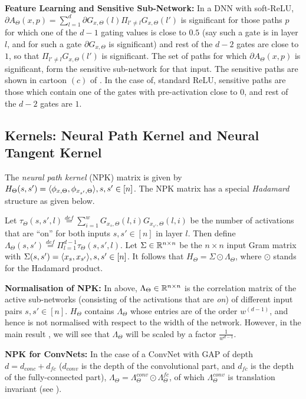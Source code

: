 \textbf{Feature Learning and Sensitive Sub-Network:} In a DNN with soft-ReLU, $\partial A_{\Theta}(x,p)=\sum_{l=1}^d \partial G_{x,\Theta}(l)\Pi_{l'\neq l}G_{x,\Theta}(l')$ is significant for those paths $p$ for which one of the $d-1$ gating values is close to $0.5$ (say such a gate is in layer $l$, and for such a gate $\partial G_{x,\Theta}$ is significant) and rest of the $d-2$ gates are close to $1$, so that $\Pi_{l'\neq l}G_{x,\Theta}(l')$ is significant. The set of paths for which $\partial A_{\Theta}(x,p)$ is significant, form the sensitive sub-network for that input. The sensitive paths are shown in cartoon $(c)$ of . In the case of, standard ReLU, sensitive paths are those which contain one of the gates with pre-activation close to $0$, and rest of the $d-2$ gates are $1$.
\subsection{Kernels: Neural Path Kernel and Neural Tangent Kernel}\label{sec:ker}
The \emph{neural path kernel} (NPK) matrix is given by $H_{\Theta}(s,s')=\langle \phi_{x,\Theta},\phi_{x_{s'},\Theta}\rangle, s, s'\in[n]$. The NPK matrix has a special \emph{Hadamard} structure as given below.
\begin{lemma}\label{lm:npk}
Let $\tau_{\Theta}(s,s',l)\stackrel{def}=\sum_{i=1}^w G_{x_s,\Theta}(l,i)G_{x_{s'},\Theta}(l,i)$ be the number of activations that are ``on'' for both inputs $s,s'\in[n]$ in layer $l$. Then define $\Lambda_{\Theta}(s,s')\stackrel{def}=\Pi_{l=1}^{d-1}\tau_{\Theta}(s,s',l)$.
Let $\Sigma \in \mathbb{R}^{n\times n}$ be the $n\times n $ input Gram matrix with  $\Sigma(s,s')=\langle x_s,x_{s'}\rangle,s,s'\in[n]$. It follows that $H_{\Theta}= \Sigma\odot\Lambda_{\Theta}$, where $\odot$ stands for the Hadamard product. 
\end{lemma}
\textbf{Normalisation of NPK:} In  above, $\Lambda_{\Theta}\in\mathbb{R}^{n\times n}$ is the correlation matrix of the active sub-networks (consisting of the activations that are \emph{on}) of different input pairs $s,s'\in[n]$. $H_{\Theta}$ contains $\Lambda_{\Theta}$ whose entries are of the order $w^{(d-1)}$, and hence is not normalised with respect to the width of the network.  However, in the main result , we will see that $\Lambda_{\Theta}$ will be scaled by a factor $\frac{1}{w^{d-1}}$. 

\textbf{NPK for ConvNets:} In the case of a ConvNet  with GAP of depth $d=d_{conc}+d_{fc}$ ($d_{conv}$ is the depth of the convolutional part, and $d_{fc}$ is the depth of the fully-connected part), $\Lambda_{\Theta}=\Lambda^{conv}_{\Theta}\odot\Lambda^{fc}_{\Theta}$, of which $\Lambda^{conv}_{\Theta}$ is translation invariant (see ). 

